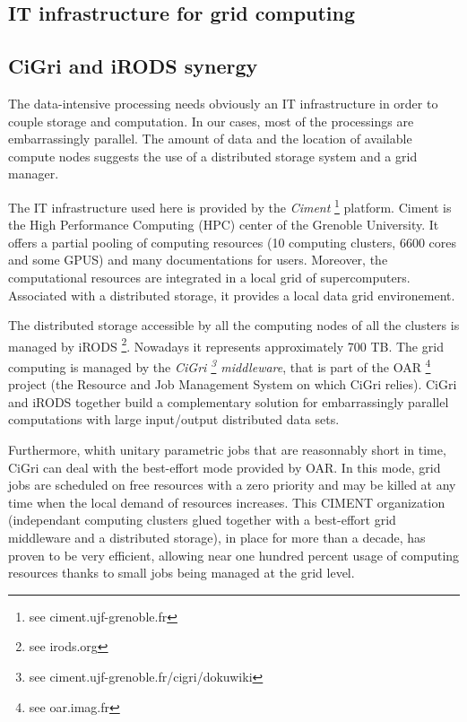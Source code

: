 \documentclass[a4paper, 10pt]{article}
\begin{document}
\begin{multicols}{2}



\section{IT infrastructure for grid computing}%


\subsection{CiGri and iRODS synergy}

The data-intensive processing
needs obviously an IT infrastructure in order to couple storage and computation.
In our cases, most of the processings are embarrassingly parallel.
The amount of data and the location of available compute nodes suggests the use of a 
distributed storage system and a grid manager.


The IT infrastructure used here is provided by the \emph{Ciment} \footnote{see ciment.ujf-grenoble.fr} 
platform. Ciment is the High Performance Computing (HPC) center of the Grenoble University. It offers a partial pooling of computing 
resources (10 computing clusters, 6600 cores and some GPUS) and many documentations for users. 
Moreover, the computational resources are integrated in a local grid of supercomputers. Associated with a distributed storage,
it provides a local data grid environement.

The distributed storage accessible by all the computing nodes of all the clusters is managed by iRODS \footnote{see irods.org}.
Nowadays it represents approximately 700 TB. The grid computing is managed by the \emph{CiGri 
\footnote{see ciment.ujf-grenoble.fr/cigri/dokuwiki} middleware}, that is part of the OAR \footnote{see oar.imag.fr} project (the Resource and Job Management System on which CiGri relies). CiGri and iRODS together build a complementary solution for embarrassingly parallel computations with large input/output distributed data sets.

Furthermore, whith unitary parametric jobs that are reasonnably short in time, CiGri can deal with the best-effort mode provided by OAR. In this mode, grid jobs are scheduled on free resources with a zero priority and may be killed at any time when the local demand of resources increases. This CIMENT organization (independant computing clusters glued together with a best-effort grid middleware and a distributed storage), in place for more than a decade, has proven to be very efficient, allowing near one hundred percent usage of computing resources thanks to small jobs being managed at the grid level.


\end{multicols}
\end{document}
